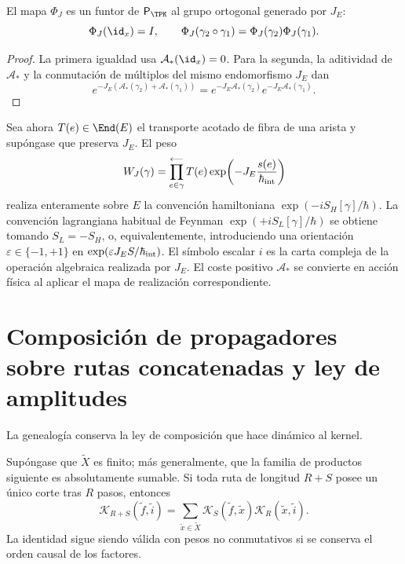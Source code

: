 \begin{proposition}
\label{prop:multiplicatividad-fase-interna}
El mapa \(\Phi_J\) es un funtor de \(\mathsf P_{\TPK}\) al grupo
ortogonal generado por \(J_E\):
\[
 \Phi_J(\id_x)=I,
 \qquad
 \Phi_J(\gamma_2\circ\gamma_1)
 =\Phi_J(\gamma_2)\Phi_J(\gamma_1).
\]
\end{proposition}

\begin{proof}
La primera igualdad usa \(\mathcal A_*(\id_x)=0\). Para la segunda, la
aditividad de \(\mathcal A_*\) y la conmutación de múltiplos del mismo
endomorfismo \(J_E\) dan
\[
 e^{-J_E(\mathcal A_*(\gamma_2)+\mathcal A_*(\gamma_1))}
 =e^{-J_E\mathcal A_*(\gamma_2)}
  e^{-J_E\mathcal A_*(\gamma_1)}.
\]
\end{proof}

Sea ahora \(T(e)\in\End(E)\) el transporte acotado de fibra de una arista y
supóngase
que preserva \(J_E\). El peso
\[
 W_J(\gamma)
 =\prod_{e\in\gamma}^{\longleftarrow}
   T(e)\exp\!\left(-J_E\frac{s(e)}{\hbar_{\rm int}}\right)
\]
realiza enteramente sobre \(E\) la convención hamiltoniana
\(\exp(-iS_H[\gamma]/\hbar)\). La convención lagrangiana habitual de Feynman
\(\exp(+iS_L[\gamma]/\hbar)\) se obtiene tomando \(S_L=-S_H\), o,
equivalentemente, introduciendo una orientación
\(\varepsilon\in\{-1,+1\}\) en
\(\exp(\varepsilon J_ES/\hbar_{\rm int})\). El símbolo escalar \(i\) es la
carta compleja de la operación algebraica realizada por \(J_E\). El coste
positivo \(\mathcal A_*\) se convierte en acción física al aplicar el mapa de
realización correspondiente.

\section{Composición de propagadores sobre rutas concatenadas y ley de amplitudes}

La genealogía conserva la ley de composición que hace dinámico al kernel.

\begin{proposition}
\label{prop:chapman-kolmogorov-genealogico}
Supóngase que \(\widetilde X\) es finito; más generalmente, que la familia de
productos siguiente es absolutamente sumable. Si toda ruta de longitud
\(R+S\) posee un único corte tras \(R\) pasos, entonces
\begin{equation}
 \mathcal K_{R+S}(\widetilde f,\widetilde i)
 =\sum_{\widetilde x\in\widetilde X}
   \mathcal K_S(\widetilde f,\widetilde x)
   \mathcal K_R(\widetilde x,\widetilde i).
 \label{eq:convolucion-kernel}
\end{equation}
La identidad sigue siendo válida con pesos no conmutativos si se conserva el
orden causal de los factores.
\end{proposition}

